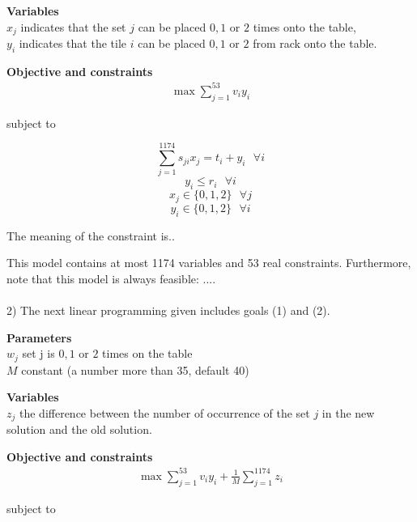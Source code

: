 \documentclass[11pt]{article}
\begin{document}
	
	\textbf{Variables}\\
	$x_j$ indicates that the set $j$ can be placed $0,1$ or $2$ times onto the table,\\
	$y_i$ indicates that the tile $i$ can be placed $0,1$ or $2$ from rack onto the table.

	
	\textbf{Objective and constraints}\\
\begin{equation}
\begin{aligned}
	\max\sum_{j=1}^{53}v_iy_i
\end{aligned}
\end{equation}

	
	
	subject to
	
	\[\sum_{j=1}^{1174}s_{ji}x_j=t_i+y_i\text{ } \forall i\]
	\[y_i\leq r_i\text{ } \forall i\]
	\[x_j\in\{0,1,2\}\text{ } \forall j\]
	\[y_i\in\{0,1,2\}\text{ } \forall i\]

	The meaning of the constraint is.. %
	
	
	This model contains at most 1174 variables and 53 real constraints. Furthermore, note that this model is always feasible: ....\\
\\%
{\large 2) The next linear programming given includes goals (1) and (2).}
	
	
	\textbf{Parameters}\\
	$w_j$ set j is $0,1$ or $2$ times on the table\\
	$M$ constant (a number more than 35, default 40)
	
	\textbf{Variables}\\
	$z_j$ the difference between the number of occurrence of the set $j$ in the new solution and the old solution.
		
	
	\textbf{Objective and constraints}\\
\begin{equation}
\begin{aligned}
	\max\sum_{j=1}^{53}v_iy_i+\frac{1}{M}\sum_{j=1}^{1174}z_i
\end{aligned}
\end{equation}

	subject to
	
\end{document}
